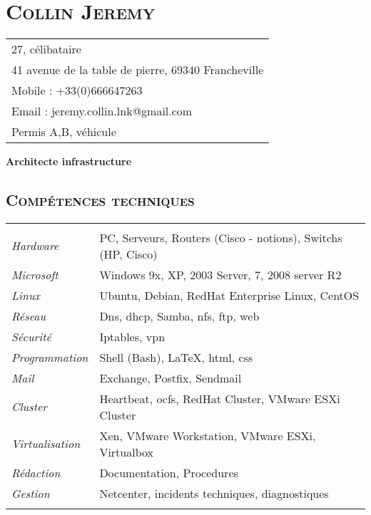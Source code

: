 \documentclass[a4paper,8pt]{article}
\newcommand{\hsection}[1]{\section*{\fontfamily{phv}\selectfont\textsc{#1}}}
\newcommand{\hsubsection}[1]{\subsection*{\fontfamily{phv}\selectfont\textsc{#1}}}
\begin{document}
\selectfont
\hsection{Collin Jeremy}
\begin{tabular}{p{16.5cm}}
\hline
27, célibataire\\
41 avenue de la table de pierre, 69340 Francheville\\
Mobile : +33(0)666647263\\
Email : jeremy.collin.lnk@gmail.com\\
Permis A,B, véhicule\\
\end{tabular}
\begin{center}
\textbf{{\Large Architecte infrastructure}}
\end{center}
\hsubsection{Compétences techniques}
\begin{tabular}{P{3.5cm}|p{13cm}}
 & \\
\textsl{Hardware}		& PC, Serveurs, Routers (Cisco - notions), Switchs (HP, Cisco)\\
\textsl{Microsoft}	&	Windows 9x, XP, 2003 Server, 7, 2008 server R2\\
\textsl{Linux}			& Ubuntu, Debian, RedHat Enterprise Linux, CentOS\\
\textsl{Réseau}			& Dns, dhcp, Samba, nfs, ftp, web\\
\textsl{Sécurité}		& Iptables, vpn\\
\textsl{Programmation}		& Shell (Bash), \LaTeX, html, css\\
\textsl{Mail}			& Exchange, Postfix, Sendmail\\
\textsl{Cluster}		& Heartbeat, ocfs, RedHat Cluster, VMware ESXi Cluster\\
\textsl{Virtualisation}		& Xen, VMware Workstation, VMware ESXi, Virtualbox\\
\textsl{Rédaction}		& Documentation, Procedures\\
\textsl{Gestion}		& Netcenter, incidents techniques, diagnostiques\\
 & \\
\end{tabular}
\end{document}
